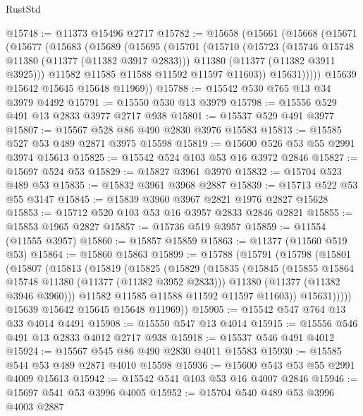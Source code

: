 \begin{lexlean}{RustStd}
\begin{coremodule}
@15748 := @11373 @15496 @2717
@15782 := @15658
    (@15661
      (@15668
        (@15671
          (@15677
            (@15683
              (@15689
                (@15695
                  (@15701
                    (@15710
                      (@15723
                        (@15746 @15748 @11380 (@11377 (@11382 @3917 @2833)))
                        @11380
                        (@11377 (@11382 @3911 @3925)))
                      @11582
                      @11585
                      @11588
                      @11592
                      @11597
                      @11603))
                  @15631)))))
        @15639
        @15642
        @15645
        @15648
        @11969))
@15788 := @15542 @530 @765 @13 @34 @3979 @4492
@15791 := @15550 @530 @13 @3979
@15798 := @15556 @529 @491 @13 @2833 @3977 @2717 @938
@15801 := @15537 @529 @491 @3977
@15807 := @15567 @528 @86 @490 @2830 @3976 @15583
@15813 := @15585 @527 @53 @489 @2871 @3975 @15598
@15819 := @15600 @526 @53 @55 @2991 @3974 @15613
@15825 := @15542 @524 @103 @53 @16 @3972 @2846
@15827 := @15697 @524 @53
@15829 := @15827 @3961 @3970
@15832 := @15704 @523 @489 @53
@15835 := @15832 @3961 @3968 @2887
@15839 := @15713 @522 @53 @55 @3147
@15845 := @15839 @3960 @3967 @2821 @1976 @2827 @15628
@15853 := @15712 @520 @103 @53 @16 @3957 @2833 @2846 @2821
@15855 := @15853 @1965 @2827
@15857 := @15736 @519 @3957
@15859 := @11554 (@11555 @3957)
@15860 := @15857 @15859
@15863 := @11377 (@11560 @519 @53)
@15864 := @15860 @15863
@15899 := @15788
    (@15791
      (@15798
        (@15801
          (@15807
            (@15813
              (@15819
                (@15825
                  (@15829
                    (@15835
                      (@15845
                        (@15855 @15864 @15748 @11380 (@11377 (@11382 @3952 @2833)))
                        @11380
                        (@11377 (@11382 @3946 @3960)))
                      @11582
                      @11585
                      @11588
                      @11592
                      @11597
                      @11603))
                  @15631)))))
        @15639
        @15642
        @15645
        @15648
        @11969))
@15905 := @15542 @547 @764 @13 @33 @4014 @4491
@15908 := @15550 @547 @13 @4014
@15915 := @15556 @546 @491 @13 @2833 @4012 @2717 @938
@15918 := @15537 @546 @491 @4012
@15924 := @15567 @545 @86 @490 @2830 @4011 @15583
@15930 := @15585 @544 @53 @489 @2871 @4010 @15598
@15936 := @15600 @543 @53 @55 @2991 @4009 @15613
@15942 := @15542 @541 @103 @53 @16 @4007 @2846
@15946 := @15697 @541 @53 @3996 @4005
@15952 := @15704 @540 @489 @53 @3996 @4003 @2887

\end{coremodule}
\end{lexlean}
